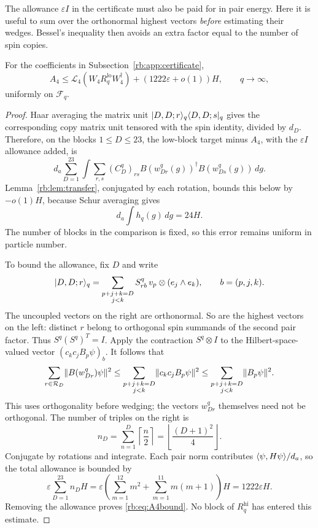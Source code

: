 The allowance $\varepsilon I$ in the certificate must also be paid for in pair
energy.  Here it is useful to sum over the orthonormal highest vectors
\emph{before} estimating their wedges.  Bessel's inequality then avoids
an extra factor equal to the number of spin copies.

\begin{proposition}\label{rb:prop:A4}
For the coefficients in Subsection~\ref{rb:app:certificate},
\begin{equation}\label{rb:eq:A4bound}
 A_4\le\mathcal L_4(W_4R_q^{\mathrm{lo}}W_4^\dagger)+(1222\varepsilon+o(1))H,
 \qquad q\to\infty,
\end{equation}
uniformly on $\mathcal F_q$.
\end{proposition}
\begin{proof}
Haar averaging the matrix unit
$\lvert D,D;r\rangle_q\langle D,D;s\rvert_q$ gives the corresponding copy matrix unit
tensored with the spin identity, divided by $d_D$.  Therefore, on the
blocks $1\le D\le23$, the low-block target minus $A_4$, with the $\varepsilon I$ allowance
added, is
\[
 d_a\sum_{D=1}^{23}\int\sum_{r,s}(C_D^q)_{rs}
 B(w_{Dr}^q(g))^\dagger B(w_{Ds}^q(g))\,dg.
\]
Lemma~\ref{rb:lem:transfer}, conjugated by each rotation, bounds this below
by $-o(1)H$, because Schur averaging gives
\[
 d_a\int h_q(g)\,dg=24H.
\]
The number of blocks in the comparison is fixed, so this error remains uniform
in particle number.

To bound the allowance, fix $D$ and write
\[
 \lvert D,D;r\rangle_q
   =\sum_{\substack{p+j+k=D\\j<k}}S_{rb}^q\,
                     v_p\otimes(e_j\wedge e_k),
 \qquad b=(p,j,k).
\]
The uncoupled vectors on the right are orthonormal.  So are the highest
vectors on the left: distinct $r$ belong to orthogonal spin summands of
the second pair factor.  Thus $S^q(S^q)^T=I$.  Apply the contraction
$S^q\otimes I$ to the Hilbert-space-valued vector
$(c_kc_jB_p\psi)_b$.  It follows that
\[
 \sum_{r\in\mathcal R_D}\lVert B(w_{Dr}^q)\psi\rVert^2
 \le\sum_{\substack{p+j+k=D\\j<k}}\lVert c_kc_jB_p\psi\rVert^2
 \le\sum_{\substack{p+j+k=D\\j<k}}\lVert B_p\psi\rVert^2.
\]
This uses orthogonality before wedging; the vectors $w_{Dr}^q$ themselves
need not be orthogonal.  The number of triples on the right is
\[
 n_D=\sum_{n=1}^D\left\lceil\frac n2\right\rceil
     =\left\lfloor\frac{(D+1)^2}{4}\right\rfloor.
\]
Conjugate by rotations and integrate.  Each pair norm contributes
$\langle \psi,H\psi\rangle/d_a$, so the total allowance is bounded by
\[
 \varepsilon\sum_{D=1}^{23}n_DH
 =\varepsilon\left(\sum_{m=1}^{12}m^2+
                 \sum_{m=1}^{11}m(m+1)\right)H
 =1222\varepsilon H.
\]
Removing the allowance proves \eqref{rb:eq:A4bound}. No block of
$R_q^{\mathrm{hi}}$ has entered this estimate.
\end{proof}

